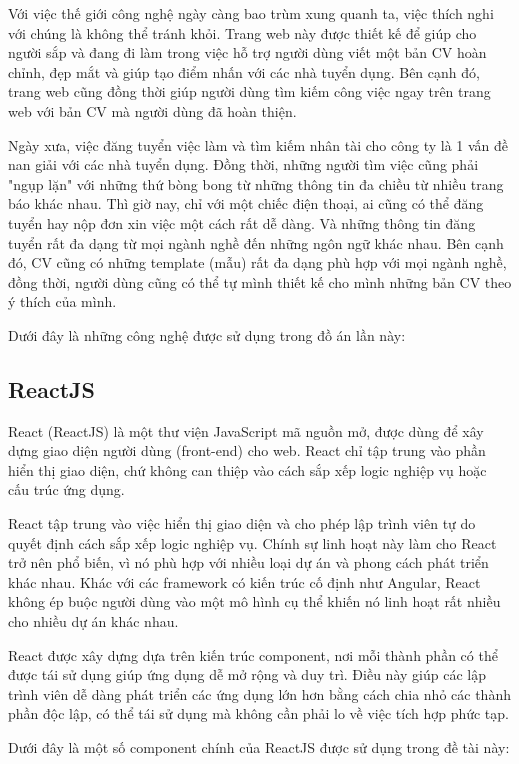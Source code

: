 Với việc thế giới công nghệ ngày càng bao trùm xung quanh ta, việc thích nghi với chúng là không thể tránh khỏi. Trang web này được thiết kế để giúp cho người sắp và đang đi làm trong việc hỗ trợ người dùng viết một bản CV hoàn chỉnh, đẹp mắt và giúp tạo điểm nhấn với các nhà tuyển dụng. Bên cạnh đó, trang web cũng đồng thời giúp người dùng tìm kiếm công việc ngay trên trang web với bản CV mà người dùng đã hoàn thiện.

Ngày xưa, việc đăng tuyển việc làm và tìm kiếm nhân tài cho công ty là 1 vấn đề nan giải với các nhà tuyển dụng. Đồng thời, những người tìm việc cũng phải "ngụp lặn" với những thứ bòng bong từ những thông tin đa chiều từ nhiều trang báo khác nhau. Thì giờ nay, chỉ với một chiếc điện thoại, ai cũng có thể đăng tuyển hay nộp đơn xin việc một cách rất dễ dàng. Và những thông tin đăng tuyển rất đa dạng từ mọi ngành nghề đến những ngôn ngữ khác nhau. Bên cạnh đó, CV cũng có những template (mẫu) rất đa dạng phù hợp với mọi ngành nghề, đồng thời, người dùng cũng có thể tự mình thiết kế cho mình những bản CV theo ý thích của mình.

Dưới đây là những công nghệ được sử dụng trong đồ án lần này:

\subsection{ReactJS}
React (ReactJS) là một thư viện JavaScript mã nguồn mở, được dùng để xây dựng giao diện người dùng (front-end) cho web. React chỉ tập trung vào phần hiển thị giao diện, chứ không can thiệp vào cách sắp xếp logic nghiệp vụ hoặc cấu trúc ứng dụng.

React tập trung vào việc hiển thị giao diện và cho phép lập trình viên tự do quyết định cách sắp xếp logic nghiệp vụ. Chính sự linh hoạt này làm cho React trở nên phổ biến, vì nó phù hợp với nhiều loại dự án và phong cách phát triển khác nhau. Khác với các framework có kiến trúc cố định như Angular, React không ép buộc người dùng vào một mô hình cụ thể khiến nó linh hoạt rất nhiều cho nhiều dự án khác nhau.

React được xây dựng dựa trên kiến trúc component, nơi mỗi thành phần có thể được tái sử dụng giúp ứng dụng dễ mở rộng và duy trì. Điều này giúp các lập trình viên dễ dàng phát triển các ứng dụng lớn hơn bằng cách chia nhỏ các thành phần độc lập, có thể tái sử dụng mà không cần phải lo về việc tích hợp phức tạp.

Dưới đây là một số component chính của ReactJS được sử dụng trong đề tài này:


